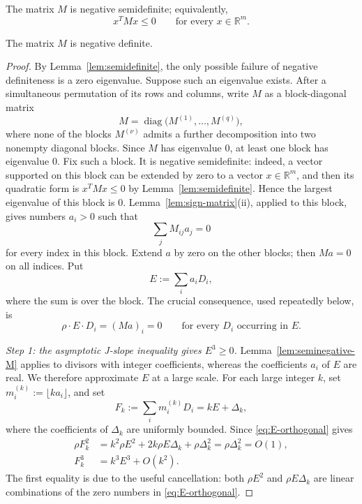 \documentclass[10pt,a4paper]{amsart}
\def\R{\mathbb{R}}
\begin{document}
\begin{lemma}\label{lem:semidefinite}
The matrix $M$ is negative semidefinite; equivalently,
\[
 x^TMx\leq0\qquad\text{for every }x\in\R^m.
\]
\end{lemma}

\begin{thm}\label{thm:negative}
The matrix $M$ is negative definite.
\end{thm}

\begin{proof}
By Lemma~\ref{lem:semidefinite}, the only possible failure of negative
definiteness is a zero eigenvalue.  Suppose such an eigenvalue exists. After a simultaneous permutation of its rows and columns, write $M$
as a block-diagonal matrix
\[
 M=\operatorname{diag}\bigl(M^{(1)},\ldots,M^{(q)}\bigr),
\]
where none of the blocks $M^{(\nu)}$ admits a further decomposition
into two nonempty diagonal blocks.   Since $M$ has eigenvalue $0$, at least one block has
eigenvalue $0$.  Fix such a block.  It is negative semidefinite:
indeed, a vector supported on this block can be extended by zero to a
vector $x\in\R^m$, and then its quadratic form is $x^TMx\leq0$ by
Lemma~\ref{lem:semidefinite}.  Hence the largest eigenvalue of this
block is $0$.
Lemma~\ref{lem:sign-matrix}(ii), applied to this block, gives numbers
$a_i>0$ such that
\[
 \sum_jM_{ij}a_j=0
\]
for every index in this block.  Extend $a$ by zero on the other blocks;
then $Ma=0$ on all indices.  Put
\[
 E:=\sum_i a_iD_i,
\]
where the sum is over the block.
The crucial consequence, used repeatedly below, is
\begin{equation}\label{eq:E-orthogonal}
 \rho\cdot E\cdot D_i=(Ma)_i=0
 \qquad\text{for every }D_i\text{ occurring in }E.
\end{equation}

\smallskip
\noindent\emph{Step 1: the asymptotic J-slope inequality gives
$E^3\geq0$.}
Lemma~\ref{lem:seminegative-M} applies to divisors with integer coefficients,
whereas the coefficients $a_i$ of $E$ are real.  We therefore
approximate $E$ at a large scale.  For each large integer $k$, set  $m_i^{(k)}:=\lfloor ka_i\rfloor$, and set
\[
 F_k:=\sum_i m_i^{(k)}D_i=kE+\Delta_k,
\]
where the coefficients of $\Delta_k$ are uniformly bounded.  Since
\eqref{eq:E-orthogonal} gives
\begin{equation}\label{eq:rounded-asymptotics}
\begin{aligned}
 \rho F_k^2
 &=k^2\rho E^2+2k\rho E\Delta_k+\rho\Delta_k^2
   =\rho\Delta_k^2=O(1),\\
 F_k^3&=k^3E^3+O(k^2).
\end{aligned}
\end{equation}
The first equality is due to the useful cancellation: both $\rho E^2$ and
$\rho E\Delta_k$ are linear combinations of the zero numbers in
\eqref{eq:E-orthogonal}.


\end{proof}
\end{document}

